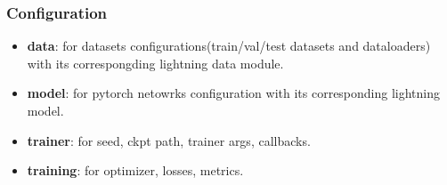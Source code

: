 \subsubsection{Configuration}
\begin{itemize}
    \item \textbf{data}: for datasets configurations(train/val/test datasets and dataloaders) with its correspongding lightning data module.
    \item \textbf{model}: for pytorch netowrks configuration with its corresponding lightning model.
    \item \textbf{trainer}: for seed, ckpt path, trainer args, callbacks.
    \item \textbf{training}: for optimizer, losses, metrics.
\end{itemize}



